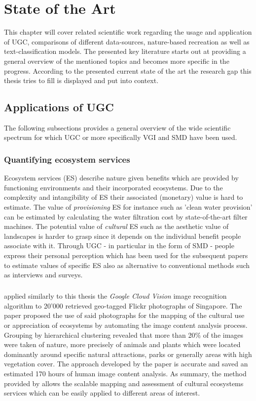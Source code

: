 \chapter{State of the Art} \label{state_of_the_art}
This chapter will cover related scientific work regarding the usage and application of UGC, comparisons of different data-sources, nature-based recreation as well as text-classification models. The presented key literature starts out at providing a general overview of the mentioned topics and becomes more specific in the progress. According to the presented current state of the art the research gap this thesis tries to fill is displayed and put into context.

\section{Applications of UGC}
The following subsections provides a general overview of the wide scientific spectrum for which UGC or more specifically VGI and SMD have been used.

\subsection{Quantifying ecosystem services}
Ecosystem services (ES) describe nature given benefits which are provided by functioning environments and their incorporated ecosystems. Due to the complexity and intangibility of ES their associated (monetary) value is hard to estimate. The value of \textit{provisioning} ES for instance such as 'clean water provision' can be estimated by calculating the water filtration cost by state-of-the-art filter machines. The potential value of \textit{cultural} ES such as the aesthetic value of landscapes is harder to grasp since it depends on the individual benefit people associate with it. Through UGC - in particular in the form of SMD - people express their personal perception which has been used for the subsequent papers to estimate values of specific ES also as alternative to conventional methods such as interviews and surveys.  
\paragraph*{\textcite{Richards2018}} applied similarly to this thesis the \textit{Google Cloud Vision} image recognition algorithm to 20'000 retrieved geo-tagged Flickr photographs of Singapore. The paper proposed the use of said photographs for the mapping of the cultural use or appreciation of ecosystems by automating the image content analysis process. Grouping by hierarchical clustering revealed that more than 20\% of the images were taken of nature, more precisely of animals and plants which were located dominantly around specific natural attractions, parks or generally areas with high vegetation cover. The approach developed by the paper is accurate and saved an estimated 170 hours of human image content analysis. As summary, the method provided by \textcite{Richards2018} allows the scalable mapping and assessment of cultural ecosystems services which can be easily applied to different areas of interest.

